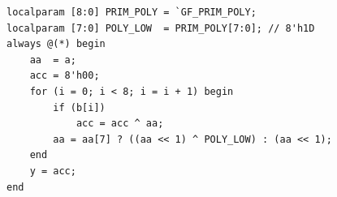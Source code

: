 \documentclass[11pt,a4paper]{report}
\begin{document}
\begin{table}[!htb]
    \centering
    \caption{Tính tay 8 bước thuật toán dịch--XOR cho phép nhân $\texttt{0x57} \times \texttt{0x83} = \texttt{0x31}$}
    \label{tab:mul-trace-57-83}
    \scriptsize
    \setlength{\tabcolsep}{3.5pt}
\end{table}

\begin{lstlisting}[style=verilogstyle, caption={Triển khai mạch nhân tổ hợp 8 bước trong \texttt{rtl/gf\_arithmetic/gf256\_mul.v}}, label={lst:gf256-mul}]
localparam [8:0] PRIM_POLY = `GF_PRIM_POLY;
localparam [7:0] POLY_LOW  = PRIM_POLY[7:0]; // 8'h1D
always @(*) begin
    aa  = a;
    acc = 8'h00;
    for (i = 0; i < 8; i = i + 1) begin
        if (b[i])
            acc = acc ^ aa;
        aa = aa[7] ? ((aa << 1) ^ POLY_LOW) : (aa << 1);
    end
    y = acc;
end
\end{lstlisting}
\end{document}
